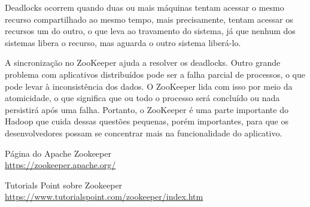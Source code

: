 \documentclass[a4paper,11pt]{article}
\begin{document}
Deadlocks ocorrem quando duas ou mais máquinas tentam acessar o mesmo recurso compartilhado ao mesmo tempo, mais precisamente, tentam acessar os recursos um do outro, o que leva ao travamento do sistema, já que nenhum dos sistemas libera o recurso, mas aguarda o outro sistema liberá-lo. 

A sincronização no ZooKeeper ajuda a resolver os deadlocks. Outro grande problema com aplicativos distribuídos pode ser a falha parcial de processos, o que pode levar à inconsistência dos dados. O ZooKeeper lida com isso por meio da atomicidade, o que significa que ou todo o processo será concluído ou nada persistirá após uma falha. Portanto, o ZooKeeper é uma parte importante do Hadoop que cuida dessas questões pequenas, porém importantes, para que os desenvolvedores possam se concentrar mais na funcionalidade do aplicativo.



\begin{thebibliography}{4}
	Página do Apache Zookeeper \\
	\url{https://zookeeper.apache.org/}

	Tutorials Point sobre Zookeeper \\
	\url{https://www.tutorialspoint.com/zookeeper/index.htm}	
	
	
\end{thebibliography}
\end{document}
